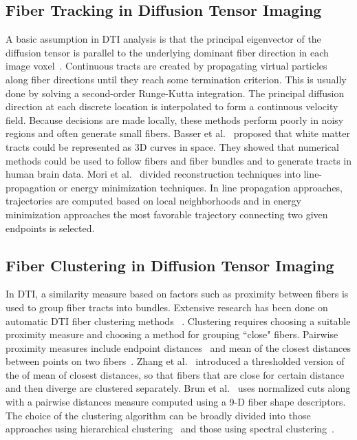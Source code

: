 \subsection {Fiber Tracking in Diffusion Tensor Imaging}
\label{subsec:fiberEx} 
A basic assumption in DTI analysis is that the principal eigenvector of the diffusion tensor is parallel to the underlying dominant fiber direction in each image voxel~\cite{Basser2002, Basser2000, Mori1999, Mori2002}. Continuous tracts are created by propagating virtual particles along fiber directions until they reach some termination criterion. 
 This is usually done by solving a second-order Runge-Kutta integration. The principal diffusion direction at each discrete location is interpolated to form a continuous velocity field. 
 Because decisions are made locally, these methods perform poorly in noisy regions and often generate small fibers. Basser et al.~\cite{Basser2002,Basser2000} proposed that white matter tracts could be represented as 3D curves in space. They showed that numerical methods could be used to follow fibers and fiber bundles and to generate tracts in human brain data. 
Mori et al.~\cite{Mori1999,Mori2002} divided reconstruction techniques into line-propagation or energy minimization techniques. In line propagation approaches, trajectories are computed based on local neighborhoods and in energy minimization approaches the most  favorable trajectory connecting two given endpoints is selected. 


\subsection {Fiber Clustering in Diffusion Tensor Imaging}
\label {subsec:fiberClus}
In DTI, a similarity measure based on factors such as proximity between fibers is used to group fiber tracts into bundles. Extensive research has been done on automatic DTI fiber clustering methods~ \cite{Brun2004,Brun2003,Corouge2004,westinMEDIA02,Zhang2008}. 
Clustering requires choosing a suitable proximity measure and choosing a method for grouping ``close" fibers.
Pairwise proximity measures include endpoint distances~\cite{Brun2003} and mean of the closest distances between points on two fibers~\cite{Corouge2004}. Zhang et al.~\cite{Zhang2008} introduced a thresholded version of the of mean of closest distances, so that fibers that are close for certain distance and then diverge are clustered separately. Brun et al.~\cite{Brun2004} uses normalized cuts along with a pairwise distances  measure computed using a 9-D fiber shape descriptors. The choice of the clustering algorithm can be broadly divided into those approaches using hierarchical clustering~\cite{Moberts2005, Zhang2008} and those using spectral clustering~\cite{ Brun2004,jonasson2005, ODonnell2007}.
 
